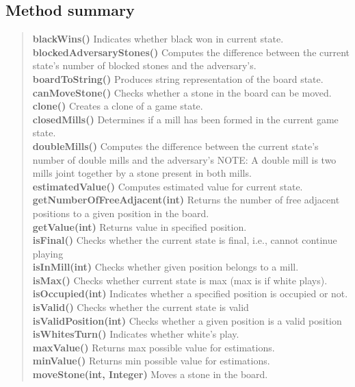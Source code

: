 \documentclass[11pt,a4paper]{report}
\begin{document}
{{{{{{{{{{\subsection{Method summary}{
\begin{verse}
{\bf blackWins()} Indicates whether black won in current state.\\
{\bf blockedAdversaryStones()} Computes the difference between the current state's number of blocked stones and the adversary's.\\
{\bf boardToString()} Produces string representation of the board state.\\
{\bf canMoveStone()} Checks whether a stone in the board can be moved.\\
{\bf clone()} Creates a clone of a game state.\\
{\bf closedMills()} Determines if a mill has been formed in the current game state.\\
{\bf doubleMills()} Computes the difference between the current state's number of double mills and the adversary's NOTE: A double mill is two mills joint together by a stone present in both mills.\\
{\bf estimatedValue()} Computes estimated value for current state.\\
{\bf getNumberOfFreeAdjacent(int)} Returns the number of free adjacent positions to a given position in the board.\\
{\bf getValue(int)} Returns value in specified position.\\
{\bf isFinal()} Checks whether the current state is final, i.e., cannot continue playing\\
{\bf isInMill(int)} Checks whether given position belongs to a mill.\\
{\bf isMax()} Checks whether current state is max (max is if white plays).\\
{\bf isOccupied(int)} Indicates whether a specified position is occupied or not.\\
{\bf isValid()} Checks whether the current state is valid\\
{\bf isValidPosition(int)} Checks whether a given position is a valid position\\
{\bf isWhitesTurn()} Indicates whether white's play.\\
{\bf maxValue()} Returns max possible value for estimations.\\
{\bf minValue()} Returns min possible value for estimations.\\
{\bf moveStone(int, Integer)} Moves a stone in the board.\\

\end{verse}}}}}}}}}}}}
\end{document}
